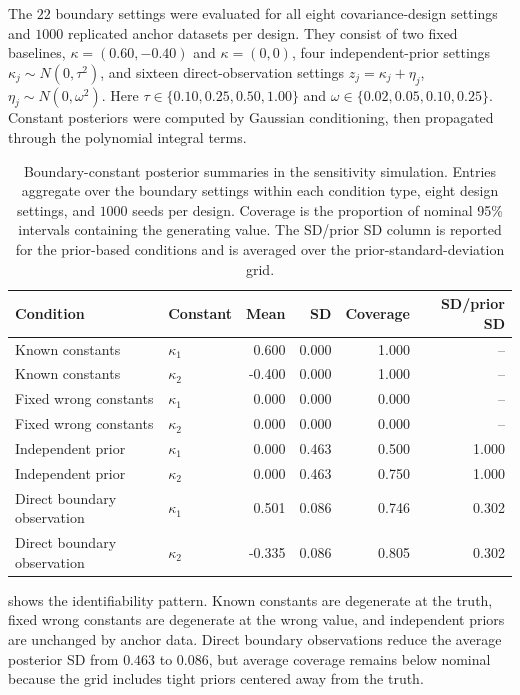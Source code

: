 \documentclass[11pt,a4paper]{article}
\theoremstyle{definition}
\theoremstyle{remark}
\begin{document}
The \(22\) boundary settings were evaluated for all eight covariance-design settings and \(1000\) replicated anchor datasets per design. They consist of two fixed baselines, \(\kappa=(0.60,-0.40)\) and \(\kappa=(0,0)\), four independent-prior settings \(\kappa_j\sim N(0,\tau^2)\), and sixteen direct-observation settings \(z_j=\kappa_j+\eta_j\), \(\eta_j\sim N(0,\omega^2)\). Here \(\tau\in\{0.10,0.25,0.50,1.00\}\) and \(\omega\in\{0.02,0.05,0.10,0.25\}\). Constant posteriors were computed by Gaussian conditioning, then propagated through the polynomial integral terms.

\begin{table}[htbp]
\centering
\caption{\label{tab:boundary-constant-kappa-summary}Boundary-constant posterior summaries in the sensitivity simulation. Entries aggregate over the boundary settings within each condition type, eight design settings, and \(1000\) seeds per design. Coverage is the proportion of nominal 95\% intervals containing the generating value. The SD/prior SD column is reported for the prior-based conditions and is averaged over the prior-standard-deviation grid.}
\begin{tabular}{llrrrr}
Condition & Constant & Mean & SD & Coverage & SD/prior SD \\
\midrule
Known constants & \(\kappa_1\) & 0.600 & 0.000 & 1.000 & -- \\
Known constants & \(\kappa_2\) & -0.400 & 0.000 & 1.000 & -- \\
Fixed wrong constants & \(\kappa_1\) & 0.000 & 0.000 & 0.000 & -- \\
Fixed wrong constants & \(\kappa_2\) & 0.000 & 0.000 & 0.000 & -- \\
Independent prior & \(\kappa_1\) & 0.000 & 0.463 & 0.500 & 1.000 \\
Independent prior & \(\kappa_2\) & 0.000 & 0.463 & 0.750 & 1.000 \\
Direct boundary observation & \(\kappa_1\) & 0.501 & 0.086 & 0.746 & 0.302 \\
Direct boundary observation & \(\kappa_2\) & -0.335 & 0.086 & 0.805 & 0.302 \\
\end{tabular}

\end{table}

 shows the identifiability pattern. Known constants are degenerate at the truth, fixed wrong constants are degenerate at the wrong value, and independent priors are unchanged by anchor data. Direct boundary observations reduce the average posterior SD from \(0.463\) to \(0.086\), but average coverage remains below nominal because the grid includes tight priors centered away from the truth.
\end{document}

